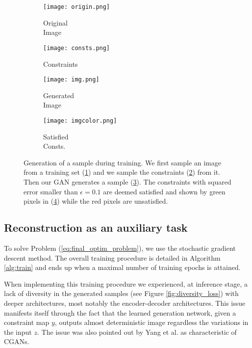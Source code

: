 \begin{figure}[t]
	\centering
	\begin{subfigure}[t]{0.25\textwidth}
		\centering
		\texttt{[image: origin.png]}
		\caption{Original\\Image}
		\label{fig:original_shoe}
	\end{subfigure}\begin{subfigure}[t]{0.25\textwidth}
		\centering
		\texttt{[image: consts.png]}
		\caption{Constraints}
		\label{fig:constraints}
	\end{subfigure}\begin{subfigure}[t]{0.25\textwidth}
		\centering
		\texttt{[image: img.png]}
		\caption{Generated\\Image}
		\label{fig:pixelwise}
	\end{subfigure}\begin{subfigure}[t]{0.24\textwidth}
		\centering
		\texttt{[image: imgcolor.png]}
		\caption{Satisfied\\Consts.}
		\label{fig:generated}
	\end{subfigure}
	\caption[Generation of a sample during training]{Generation of a sample during training. We first sample an image from a training set (\ref{fig:original_shoe}) and we sample the constraints (\ref{fig:constraints}) from it. Then our GAN generates a sample (\ref{fig:pixelwise}). The constraints with squared error smaller than $\epsilon=0.1$ are deemed satisfied and shown by green pixels in (\ref{fig:generated}) while the red pixels are unsatisfied.}
	\label{fig:image_completion}
\end{figure}

\subsection{Reconstruction as an auxiliary task}

To solve Problem (\ref{eq:final_optim_problem}), we use the stochastic gradient descent method. The overall training procedure is detailed in Algorithm \ref{alg:train} and ends up when a maximal number of training epochs is attained. 

When implementing this training procedure we experienced, at inference stage, a lack of diversity in the generated samples (see Figure \ref{fig:diversity_loss}) with deeper architectures, most notably the encoder-decoder architectures. This issue manifests itself through the fact that the learned generation network, given a constraint map $y$, outputs almost deterministic image  regardless the variations in the input $z$. The issue was also pointed out by Yang et al. \citep{Yang2019} as characteristic of CGANs.



